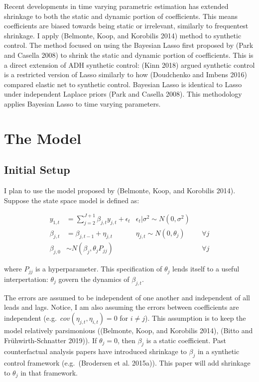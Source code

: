 \documentclass[
]{article}
\begin{document}
Recent developments in time varying parametric estimation has extended
shrinkage to both the static and dynamic portion of coefficients. This
means coefficients are biased towards being static or irrelevant,
similarly to frequentest shrinkage. I apply (Belmonte, Koop, and
Korobilis 2014) method to synthetic control. The method focused on using
the Bayesian Lasso first proposed by (Park and Casella 2008) to shrink
the static and dynamic portion of coefficients. This is a direct
extension of ADH synthetic control: (Kinn 2018) argued synthetic control
is a restricted version of Lasso similarly to how (Doudchenko and Imbens
2016) compared elastic net to synthetic control. Bayesian Lasso is
identical to Lasso under independent Laplace priors (Park and Casella
2008). This methodology applies Bayesian Lasso to time varying
parameters.

\hypertarget{the-model}{%
\section{The Model}\label{the-model}}

\hypertarget{initial-setup}{%
\subsection{Initial Setup}\label{initial-setup}}

I plan to use the model proposed by (Belmonte, Koop, and Korobilis
2014). Suppose the state space model is defined as:

\begin{align}
y_{1,t}&= \sum_{j=2}^{J+1} \beta_{j,t}y_{j,t}+\epsilon_t & \epsilon_t|\sigma^2 \sim N(0, \sigma^2) &\\
\beta_{j,t}&=\beta_{j,t-1}+\eta_{j,t} & \eta_{j,t} \sim N(0,\theta_j) &\ \ \ \  \forall j\\
\beta_{j,0}&\sim N(\beta_j,\theta_j P_{jj}) & &\ \ \ \ \forall j
\end{align}

where \(P_{jj}\) is a hyperparameter. This specification of \(\theta_j\)
lends itself to a useful interpertation: \(\theta_j\) govern the
dynamics of \(\beta_{j,t}\).

The errors are assumed to be independent of one another and independent
of all leads and lags. Notice, I am also assuming the errors between
coefficients are independent (e.g.~\(cov(\eta_{j,t},\eta_{i,t})=0\) for
\(i\ne j\)). This assumption is to keep the model relatively
parsimonious ((Belmonte, Koop, and Korobilis 2014), (Bitto and
Frühwirth-Schnatter 2019)). If \(\theta_j=0\), then \(\beta_j\) is a
static coefficient. Past counterfactual analysis papers have introduced
shrinkage to \(\beta_j\) in a synthetic control framework
(e.g.~(Brodersen et al. 2015a)). This paper will add shrinkage to
\(\theta_j\) in that framework.
\end{document}
